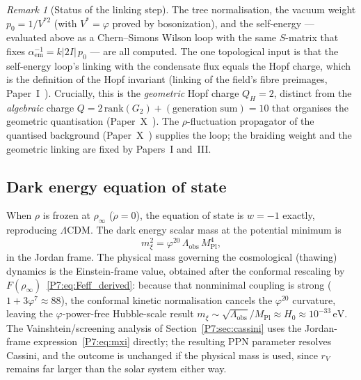 \documentclass[11pt,a4paper]{article}
\theoremstyle{definition}
\theoremstyle{remark}
\newtheorem{remark}[theorem]{Remark}
\newcommand{\vp}{\varphi}
\newcommand{\MPl}{M_{\mathrm{Pl}}}
\newcommand{\Lobs}{\Lambda_{\mathrm{obs}}}
\newcommand{\rinfty}{\rho_{\infty}}
\newcommand{\aem}{\alpha_{\mathrm{em}}}
\begin{document}
\begin{remark}[Status of the linking step]
\label{P7:rem:cc_norm_status}
The tree normalisation, the vacuum weight $p_0=1/V^{*2}$ (with $V^*=\vp$
proved by bosonization), and the self-energy --- evaluated above as a
Chern--Simons Wilson loop with the same $S$-matrix that fixes
$\aem^{-1}=k|2I|\,p_0$ --- are all computed.  The one topological input is
that the self-energy loop's linking with the condensate flux equals the
Hopf charge, which is the definition of the Hopf invariant (linking of the
field's fibre preimages, Paper~I~\cite{Paper1}).  Crucially, this is the
\emph{geometric} Hopf charge $Q_H=2$, distinct from the \emph{algebraic}
charge $Q=2\,\mathrm{rank}(G_2)+(\text{generation sum})=10$ that organises
the geometric quantisation (Paper~X~\cite{Paper10}).  The $\rho$-fluctuation
propagator of the quantised background (Paper~X~\cite{Paper10}) supplies the
loop; the braiding weight and the geometric linking are fixed by Papers~I
and~III.
\end{remark}

\subsection{Dark energy equation of state}

When $\rho$ is frozen at $\rinfty$ ($\dot\rho=0$), the equation of
state is $w=-1$ exactly, reproducing $\Lambda\mathrm{CDM}$.
The dark energy scalar mass at the potential minimum is
\begin{equation}
  m_\xi^2 = \vp^{20}\,\Lobs\,\MPl^4,
  \label{P7:eq:mxi}
\end{equation}
in the Jordan frame.  The physical mass governing the cosmological (thawing)
dynamics is the Einstein-frame value, obtained after the conformal rescaling
by $F(\rinfty)$~\eqref{P7:eq:Feff_derived}: because that nonminimal coupling
is strong ($1+3\vp^7\approx88$), the conformal kinetic normalisation cancels
the $\vp^{20}$ curvature, leaving the $\vp$-power-free Hubble-scale result
$m_\xi\sim\sqrt{\Lobs}/\MPl\approx H_0\approx10^{-33}\,\mathrm{eV}$.
The Vainshtein/screening analysis of Section~\ref{P7:sec:cassini} uses the
Jordan-frame expression~\eqref{P7:eq:mxi} directly; the resulting PPN
parameter resolves Cassini, and the outcome is unchanged if the physical
mass is used, since $r_V$ remains far larger than the solar system either way.
\end{document}
